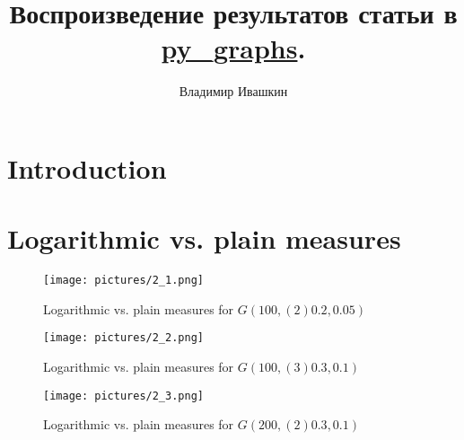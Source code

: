 \documentclass{article}
\title{
        Воспроизведение результатов статьи в \href{https://github.com/illusionww/py_graphs}{py\_graphs}.
}
\author{Владимир Ивашкин}
\begin{document}
\maketitle

\section{Introduction}

\section{Logarithmic vs. plain measures}
\begin{figure}[H]
	\texttt{[image: pictures/2\_1.png]}
	\caption{\label{f_vs1}Logarithmic vs. plain measures for $G(100, (2)0.2, 0.05)$}
\end{figure}

\begin{figure}[H]
	\texttt{[image: pictures/2\_2.png]}
	\caption{\label{f_vs2}Logarithmic vs. plain measures for $G(100, (3)0.3, 0.1)$}
\end{figure}

\begin{figure}[H]
	\texttt{[image: pictures/2\_3.png]}
	\caption{\label{f_vs3}Logarithmic vs. plain measures for $G(200, (2)0.3, 0.1)$}
\end{figure}
\nopagebreak


\newpage
\end{document}
